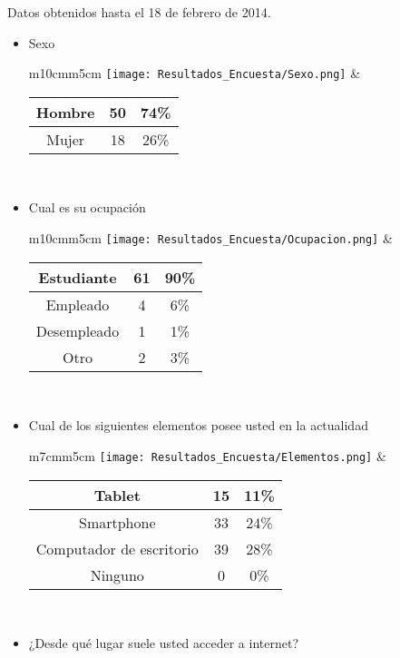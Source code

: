 Datos obtenidos hasta el 18 de febrero de 2014. \\
\begin{itemize}
  \item Sexo \\
      \begin{tabular}{m{10cm}m{5cm}}
        \texttt{[image: Resultados\_Encuesta/Sexo.png]} &
        \begin{tabular}{|c|cc|}
        \hline
         Hombre & 50 & 74\% \\ \hline
         Mujer & 18 &  26\%\\ \hline 
        \end{tabular} \\
      \end{tabular}
  \item Cual es su ocupación \\
      \begin{tabular}{m{10cm}m{5cm}}
        \texttt{[image: Resultados\_Encuesta/Ocupacion.png]} &
        \begin{tabular}{|c|cc|}
        \hline
         Estudiante & 61 & 90\% \\ \hline
         Empleado & 4 & 6\% \\ \hline 
         Desempleado & 1 & 1\% \\ \hline
         Otro & 2 & 3\% \\ \hline
        \end{tabular} \\
      \end{tabular}
  \item Cual de los siguientes elementos posee usted en la actualidad \\
      \begin{tabular}{m{7cm}m{5cm}}
        \texttt{[image: Resultados\_Encuesta/Elementos.png]} &
        \begin{tabular}{|c|cc|}
        \hline
         Tablet & 15 & 11\% \\ \hline
         Smartphone & 33 & 24\% \\ \hline
         Computador de escritorio & 39 & 28\% \\ \hline
         Ninguno & 0 & 0\% \\ \hline
        \end{tabular} \\
      \end{tabular}
  \item ¿Desde qué lugar suele usted acceder a internet? \\

\end{itemize}
